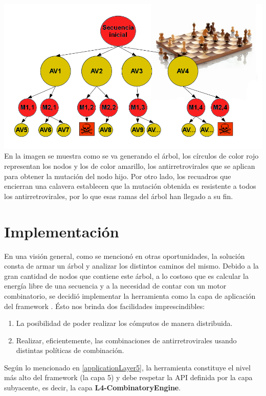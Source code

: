 \includegraphics[width=\linewidth]{images/Arbol_ajedrez.png}
En la imagen se muestra como se va generando el \'arbol, los c\'irculos de color rojo representan los nodos y los de color amarillo, los
antirretrovirales que se aplican para obtener la mutaci\'on del nodo hijo. Por otro lado, los recuadros que encierran una calavera establecen que la 
mutaci\'on obtenida es resistente a todos los antirretrovirales, por lo que esas ramas del \'arbol han llegado a su fin.

\section{Implementaci\'on}
En una visi\'on general, como se mencion\'o en otras oportunidades, la soluci\'on consta de armar un \'arbol y analizar los distintos caminos del mismo.
Debido a la gran cantidad de nodos que contiene este \'arbol, a lo costoso que es calcular la energ\'ia libre de una secuencia y a la necesidad de
contar con un motor combinatorio, se decidi\'o implementar la herramienta como la capa de aplicaci\'on del framework \fud. \'Esto nos brinda dos
facilidades imprescindibles:
\begin{enumerate}
 \item La posibilidad de poder realizar los c\'omputos de manera distribuida.
 \item Realizar, eficientemente, las combinaciones de antirretrovirales usando distintas pol\'iticas de combinaci\'on.
\end{enumerate}
  
Seg\'un lo mencionado en \ref{applicationLayer5}, la herramienta constituye el nivel m\'as alto del framework (la capa 5) y debe respetar la API
definida por la capa subyacente, es decir, la capa \textbf{L4-CombinatoryEngine}.

